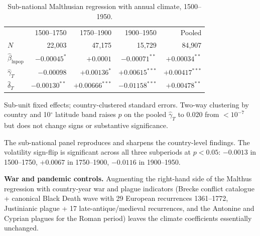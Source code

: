 \documentclass[11pt,letterpaper]{article}
\begin{document}
\begin{table}[H]
\centering
\caption{Sub-national Malthusian regression with annual climate, 1500--1950.}
\label{tab:subnat-malthus}
\small
\begin{tabular}{lrrrr}
\toprule
                                 & 1500--1750     & 1750--1900    & 1900--1950      & Pooled \\
$N$                              & 22{,}003       & 47{,}175      & 15{,}729        & 84{,}907 \\
\midrule
$\hat\beta_{\ln \text{pop}}$     & $-0.00045^*$   & $+0.0001$     & $-0.00071^{**}$ & $+0.00034^{**}$ \\
$\hat\gamma_T$                   & $-0.00098$     & $+0.00136^*$  & $+0.00615^{***}$& $+0.00417^{***}$ \\
$\hat\delta_T$                   & $-0.00130^{**}$& $+0.00666^{***}$ & $-0.01158^{***}$& $+0.00478^{**}$ \\
\bottomrule
\end{tabular}
\par\smallskip
\footnotesize{Sub-unit fixed effects; country-clustered standard errors. Two-way clustering by country and 10$^\circ$ latitude band raises $p$ on the pooled $\hat\gamma_T$ to $0.020$ from $<10^{-7}$ but does not change signs or substantive significance.}
\end{table}

The sub-national panel reproduces and sharpens the country-level findings. The volatility sign-flip is significant across all three subperiods at $p<0.05$: $-0.0013$ in 1500--1750, $+0.0067$ in 1750--1900, $-0.0116$ in 1900--1950.

\textbf{War and pandemic controls.} Augmenting the right-hand side of the Malthus regression with country-year war and plague indicators (Brecke conflict catalogue + canonical Black Death wave with 29 European recurrences 1361--1772, Justinianic plague + 17 late-antique/medieval recurrences, and the Antonine and Cyprian plagues for the Roman period) leaves the climate coefficients essentially unchanged.
\end{document}
